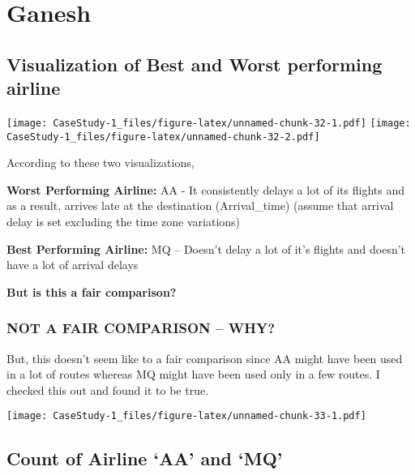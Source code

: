 \documentclass[]{article}
\newenvironment{Shaded}{\begin{snugshade}}{\end{snugshade}}
\newcommand{\KeywordTok}[1]{\textcolor[rgb]{0.13,0.29,0.53}{\textbf{#1}}}
\newcommand{\NormalTok}[1]{#1}
\newcommand{\OperatorTok}[1]{\textcolor[rgb]{0.81,0.36,0.00}{\textbf{#1}}}
\newcommand{\StringTok}[1]{\textcolor[rgb]{0.31,0.60,0.02}{#1}}
\begin{document}
\hypertarget{ganesh}{%
\section{Ganesh}\label{ganesh}}

\hypertarget{visualization-of-best-and-worst-performing-airline}{%
\subsection{Visualization of Best and Worst performing
airline}\label{visualization-of-best-and-worst-performing-airline}}

\texttt{[image: CaseStudy-1\_files/figure-latex/unnamed-chunk-32-1.pdf]}
\texttt{[image: CaseStudy-1\_files/figure-latex/unnamed-chunk-32-2.pdf]}

According to these two visualizations,

\textbf{Worst Performing Airline:} AA - It consistently delays a lot of
its flights and as a result, arrives late at the destination
(Arrival\_time) (assume that arrival delay is set excluding the time
zone variations)

\textbf{Best Performing Airline:} MQ -- Doesn't delay a lot of it's
flights and doesn't have a lot of arrival delays

\textbf{But is this a fair comparison?}

\hypertarget{not-a-fair-comparison-why}{%
\subsubsection{NOT A FAIR COMPARISON --
WHY?}\label{not-a-fair-comparison-why}}

But, this doesn't seem like to a fair comparison since AA might have
been used in a lot of routes whereas MQ might have been used only in a
few routes. I checked this out and found it to be true.

\texttt{[image: CaseStudy-1\_files/figure-latex/unnamed-chunk-33-1.pdf]}

\hypertarget{count-of-airline-aa-and-mq}{%
\subsection{Count of Airline `AA' and
`MQ'}\label{count-of-airline-aa-and-mq}}

\begin{Shaded}
\end{Shaded}
\end{document}
